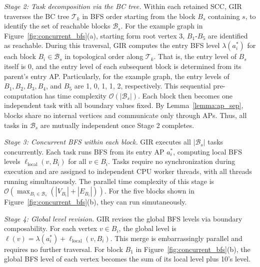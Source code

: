\textit{Stage 2: Task decomposition via the BC tree.}
Within each retained SCC, GIR traverses the BC tree $\mathcal{T}_k$
in BFS order starting from the block $B_s$ containing $s$,
to identify the set of reachable blocks $\mathcal{B}_s$.
For the example graph in Figure~\ref{fig:concurrent_bfs}(a), starting form root vertex 3, $B_1$-$B_5$ are identified as reachable.
During this traversal, GIR computes the entry BFS level $\lambda(a_i^*)$
for each block $B_i \in \mathcal{B}_s$ in topological order along $\mathcal{T}_k$.
That is, the entry level of $B_s$ itself is 0, and the entry level of each subsequent block
is determined from 
its parent's entry AP.
Particularly, for the example graph, the entry levels of $B_1, B_2, B_3, B_4$, and $B_5$ are 1, 0, 1, 1, 2, respectively. 
This sequential pre-computation has time complexity $\mathcal{O}(|\mathcal{B}_s|)$.
Each block then becomes one independent task with all boundary values fixed.
By Lemma~\ref{lemma:ap_sep}, blocks share no internal vertices
and communicate only through APs.
Thus, all tasks in $\mathcal{B}_s$ are mutually independent once Stage 2 completes. 



\textit{Stage 3: Concurrent BFS within each block.}
GIR executes all $|\mathcal{B}_s|$ tasks concurrently.
Each task runs BFS from its entry AP $a_i^*$,
computing local BFS levels $\ell_\text{local}(v, B_i)$ for all $v \in B_i$.
Tasks require no synchronization during execution
and are assigned to independent CPU worker threads,
with all threads running simultaneously.
The parallel time complexity of this stage is
$\mathcal{O}\!\left(\max_{B_i \in \mathcal{B}_s}(|V_{B_i}| + |E_{B_i}|)\right)$.
For the five blocks shown in Figure~\ref{fig:concurrent_bfs}(b), they can run simutaneously.

\textit{Stage 4: Global level revision.}
GIR revises the global BFS levels via boundary composability.
For each vertex $v \in B_i$, the global level is
$\ell(v) = \lambda(a_i^*) + \ell_\text{local}(v, B_i)$.
This merge is embarrassingly parallel and requires no further traversal. 
For block $B_1$ in Figure~\ref{fig:concurrent_bfs}(b), the global BFS level of each vertex becomes the sum of its local level plus 10's level.

